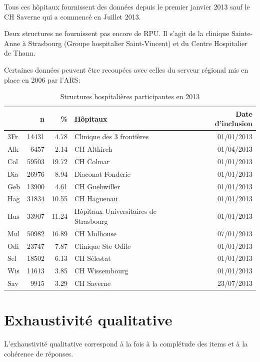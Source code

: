 \documentclass[12pt,english,french,twoside]{report}\usepackage[]{graphicx}\usepackage[]{color}
\begin{document}
Tous ces hôpitaux fournissent des données depuis le premier janvier 2013 sauf le CH Saverne qui a commencé en Juillet 2013.

Deux structures ne fournissent pas encore de RPU. Il s'agit de la clinique Sainte-Anne à Strasbourg (Groupe hospitalier Saint-Vincent) et du Centre Hospitalier de Thann.

Certaines données peuvent être recoupées avec celles du serveur régional mis en place en 2006 par l'ARS: 


\begin{table}[ht]
\centering
\begin{tabular}{|l|r|r|l|r|}
  \hline
 & n & \% & Hôpitaux & Date d'inclusion \\ 
  \hline
3Fr & 14431 & 4.78 & Clinique des 3 frontières & 01/01/2013 \\ 
  Alk & 6457 & 2.14 & CH Altkirch & 01/04/2013 \\ 
  Col & 59503 & 19.72 & CH Colmar & 01/01/2013 \\ 
  Dia & 26976 & 8.94 & Diaconat Fonderie & 01/01/2013 \\ 
  Geb & 13900 & 4.61 & CH Guebwiller & 01/01/2013 \\ 
  Hag & 31834 & 10.55 & CH Haguenau & 01/01/2013 \\ 
  Hus & 33907 & 11.24 & Hôpitaux Universitaires de Strasbourg & 01/01/2013 \\ 
  Mul & 50982 & 16.89 & CH Mulhouse & 07/01/2013 \\ 
  Odi & 23747 & 7.87 & Clinique Ste Odile & 01/01/2013 \\ 
  Sel & 18502 & 6.13 & CH Sélestat & 01/01/2013 \\ 
  Wis & 11613 & 3.85 & CH Wissembourg & 01/01/2013 \\ 
  Sav & 9915 & 3.29 & CH Saverne & 23/07/2013 \\ 
   \hline
\end{tabular}
\caption{Structures hospitalières participantes en 2013} 
\label{tab1}
\end{table}



\section{Exhaustivité qualitative}

L'exhaustivité qualitative correspond à la fois à la complétude des items et à la cohérence de réponses.
\end{document}

